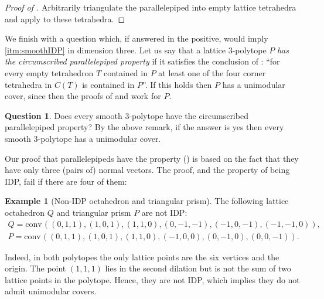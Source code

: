 \documentclass{amsart}
\theoremstyle{plain}
\theoremstyle{definition}
\newtheorem{example}[theorem]{Example}
\newtheorem{question}[theorem]{Question}
\newtheorem{remark}[theorem]{Remark}
\newcommand{\R}{ \ensuremath{\mathbb{R}}}
\newcommand{\conv}{\ensuremath{\mathrm{conv}}\hspace{1pt}}
\newcommand{\giulia}[1]{\todo[size=\tiny,color=blue!30]{#1 \\ \hfill --- G.}}
\begin{document}
\begin{proof}[Proof of ]\giulia{see comment above}
Arbitrarily triangulate the parallelepiped into empty lattice tetrahedra and apply  to these tetrahedra.
%
%
\end{proof}




We finish with a question which, if answered in the positive, would imply \eqref{itm:smoothIDP} in dimension three.
Let us say that a lattice $3$-polytope $P$ \emph{has the circumscribed parallelepiped property} if it satisfies the conclusion of :  ``for every empty tetrahedron $T$ contained in $P$ at least one of the four corner tetrahedra in $C(T)$ is 
contained in $P$''. 
If this holds then $P$ has a unimodular cover, since then the proofs of  and  work for $P$.

\begin{question}
Does every smooth 3-polytope have the circumscribed parallelepiped property? By the above remark, if the answer is yes then every smooth $3$-polytope has a unimodular cover.
\end{question}

Our proof that parallelepipeds have the property () is based on the fact that they have only three (pairs of) normal vectors. The proof, and the property of being IDP, fail if there are four of them:

\begin{example}[Non-IDP octahedron and triangular prism]
\label{ex:non-IDP}
The following lattice octahedron $Q$ and triangular prism $P$ are not IDP:
\begin{gather}
Q= \conv((0,1,1),(1,0,1),(1,1,0),(0,-1,-1),(-1,0,-1),(-1,-1,0)),\\
P=\conv((0,1,1),(1,0,1),(1,1,0),(-1,0,0),(0,-1,0),(0,0,-1)).
\end{gather}

Indeed, in both polytopes the only lattice points are the six vertices and the origin. The point $(1,1,1)$ lies in the second dilation but is not the sum of two lattice points in the polytope. Hence, they are not IDP, which implies they do not admit unimodular covers.
\end{example}
\end{document}
